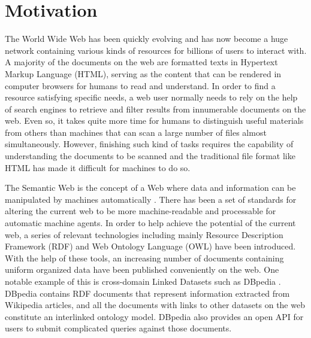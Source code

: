 


\section{Motivation} \label{section:motivation}
The World Wide Web has been quickly evolving and has now become a huge network containing various kinds of resources for billions of users to interact with. A majority of the documents on the web are formatted texts in Hypertext Markup Language (HTML), serving as the content that can be rendered in computer browsers for humans to read and understand. In order to find a resource satisfying specific needs, a web user normally needs to rely on the help of search engines to retrieve and filter results from innumerable documents on the web. Even so, it takes quite more time for humans to distinguish useful materials from others than machines that can scan a large number of files almost simultaneously. However, finishing such kind of tasks requires the capability of understanding the documents to be scanned and the traditional file format like HTML has made it difficult for machines to do so.

The Semantic Web is the concept of a Web where data and information can be manipulated by machines automatically \cite{Shadbolt2006}. There has been a set of standards for altering the current web to be more machine-readable and processable for automatic machine agents. In order to help achieve the potential of the current web, a series of relevant technologies including mainly Resource Description Framework (RDF) \cite{Cyganiak2014} and Web Ontology Language (OWL) have been introduced. With the help of these tools, an increasing number of documents containing uniform organized data have been published conveniently on the web. One notable example of this is cross-domain Linked Datasets such as DBpedia \cite{Auer2007}. DBpedia contains RDF documents that represent information extracted from Wikipedia articles, and all the documents with links to other datasets on the web constitute an interlinked ontology model. DBpedia also provides an open API for users to submit complicated queries against those documents.

